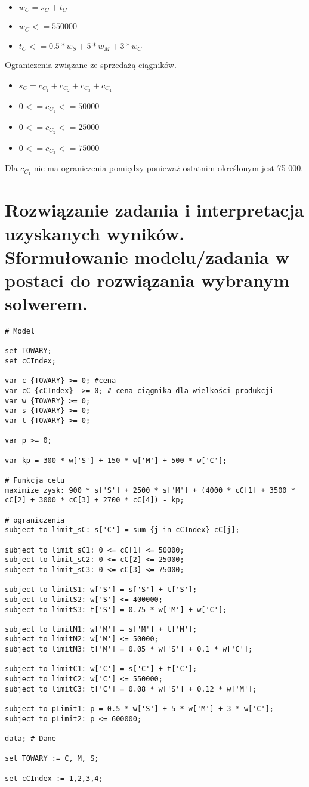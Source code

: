 \documentclass{article}
\begin{document}
\begin{itemize}
  \item $w_C = s_C + t_C$
  \item $w_C <= 550000$
  \item $t_C <= 0.5 * w_S + 5 * w_M + 3 * w_C$
\end{itemize}


Ograniczenia związane ze sprzedażą ciągników.

\begin{itemize}
  \item $s_C = c_C_1 + c_C_2 + c_C_3 + c_C_4$
  \item $0 <= c_C_1 <= 50 000$
  \item $0 <= c_C_2 <= 25 000$
  \item $0 <= c_C_3 <= 75 000$
\end{itemize}

Dla $c_C_4$ nie ma ograniczenia pomiędzy ponieważ ostatnim określonym jest 75 000.


\section{Rozwiązanie zadania i interpretacja uzyskanych wyników. Sformułowanie modelu/zadania w  postaci  do  rozwiązania  wybranym  solwerem. }

\lstset{language=AMPL}
\begin{lstlisting}[caption={Model napisany w języku AMPL},label=DescriptiveLabel]
# Model

set TOWARY;
set cCIndex;

var c {TOWARY} >= 0; #cena
var cC {cCIndex}  >= 0; # cena ciągnika dla wielkości produkcji
var w {TOWARY} >= 0;
var s {TOWARY} >= 0;
var t {TOWARY} >= 0;

var p >= 0;

var kp = 300 * w['S'] + 150 * w['M'] + 500 * w['C'];

# Funkcja celu
maximize zysk: 900 * s['S'] + 2500 * s['M'] + (4000 * cC[1] + 3500 * cC[2] + 3000 * cC[3] + 2700 * cC[4]) - kp;

# ograniczenia
subject to limit_sC: s['C'] = sum {j in cCIndex} cC[j];

subject to limit_sC1: 0 <= cC[1] <= 50000;
subject to limit_sC2: 0 <= cC[2] <= 25000;
subject to limit_sC3: 0 <= cC[3] <= 75000;

subject to limitS1: w['S'] = s['S'] + t['S'];
subject to limitS2: w['S'] <= 400000;
subject to limitS3: t['S'] = 0.75 * w['M'] + w['C'];

subject to limitM1: w['M'] = s['M'] + t['M'];
subject to limitM2: w['M'] <= 50000;
subject to limitM3: t['M'] = 0.05 * w['S'] + 0.1 * w['C'];

subject to limitC1: w['C'] = s['C'] + t['C'];
subject to limitC2: w['C'] <= 550000;
subject to limitC3: t['C'] = 0.08 * w['S'] + 0.12 * w['M'];

subject to pLimit1: p = 0.5 * w['S'] + 5 * w['M'] + 3 * w['C'];
subject to pLimit2: p <= 600000;

data; # Dane

set TOWARY := C, M, S;

set cCIndex := 1,2,3,4;
\end{lstlisting}
\end{document}
